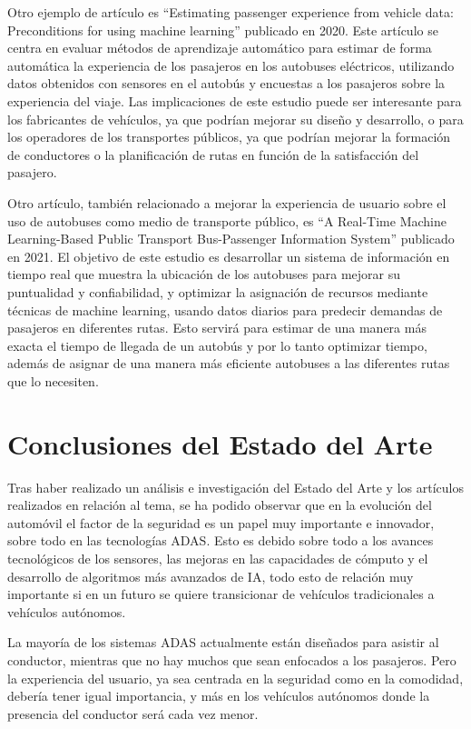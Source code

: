 \documentclass[12pt]{report} %
\begin{document}
Otro ejemplo de artículo es “Estimating passenger experience from vehicle data: Preconditions for using machine learning” \cite{rw4} publicado en 2020. Este artículo se centra en evaluar métodos de aprendizaje automático para estimar de forma automática la experiencia de los pasajeros en los autobuses eléctricos, utilizando datos obtenidos con sensores en el autobús y encuestas a los pasajeros sobre la experiencia del viaje. Las implicaciones de este estudio puede ser interesante para los fabricantes de vehículos, ya que podrían mejorar su diseño y desarrollo, o para los operadores de los transportes públicos, ya que podrían mejorar la formación de conductores o la planificación de rutas en función de la satisfacción del pasajero. 

Otro artículo, también relacionado a mejorar la experiencia de usuario sobre el uso de autobuses como medio de transporte público, es “A Real-Time Machine Learning-Based Public Transport Bus-Passenger Information System” \cite{rw5} publicado en 2021. El objetivo de este estudio es desarrollar un sistema de información en tiempo real que muestra la ubicación de los autobuses para mejorar su puntualidad y confiabilidad, y optimizar la asignación de recursos mediante técnicas de machine learning, usando datos diarios para predecir demandas de pasajeros en diferentes rutas. Esto servirá para estimar de una manera más exacta el tiempo de llegada de un autobús y por lo tanto optimizar tiempo, además de asignar de una manera más eficiente autobuses a las diferentes rutas que lo necesiten.

\section{Conclusiones del Estado del Arte}

Tras haber realizado un análisis e investigación del Estado del Arte y los artículos realizados en relación al tema, se ha podido observar que en la evolución del automóvil el factor de la seguridad es un papel muy importante e innovador, sobre todo en las tecnologías ADAS. Esto es debido sobre todo a los avances tecnológicos de los sensores, las mejoras en las capacidades de cómputo y el desarrollo de algoritmos más avanzados de IA, todo esto de relación muy importante si en un futuro se quiere transicionar de vehículos tradicionales a vehículos autónomos.

La mayoría de los sistemas ADAS actualmente están diseñados para asistir al conductor, mientras que no hay muchos que sean enfocados a los pasajeros. Pero la experiencia del usuario, ya sea centrada en la seguridad como en la comodidad, debería tener igual importancia, y más en los vehículos autónomos donde la presencia del conductor será cada vez menor.
\end{document}
